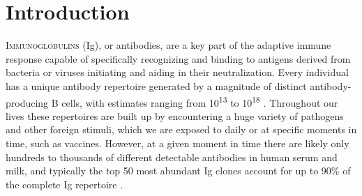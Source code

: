 \section{Introduction}
\lettrine[lraise=0.1, nindent=0em, slope=-.5em]{I}{mmunoglobulins} (Ig), or antibodies, are a key part of the adaptive immune response capable of specifically recognizing and binding to antigens derived from bacteria or viruses initiating and aiding in their neutralization. Every individual has a unique antibody repertoire generated by a magnitude of distinct antibody-producing B cells, with estimates ranging from 10\textsuperscript{13} to 10\textsuperscript{18} \cite{briney2019commonality, schroeder2006similarity}. Throughout our lives these repertoires are built up by encountering a huge variety of pathogens and other foreign stimuli, which we are exposed to daily or at specific moments in time, such as vaccines. However, at a given moment in time there are likely only hundreds to thousands of different detectable antibodies in human serum and milk, and typically the top 50 most abundant Ig clones account for up to 90\% of the complete Ig repertoire \cite{bondt2021human, bondt2021direct, dingess2023identification}.
